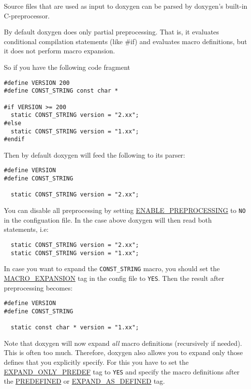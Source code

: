 Source files that are used as input to doxygen can be parsed by doxygen's built-in C-preprocessor.

By default doxygen does only partial preprocessing. That is, it evaluates conditional compilation statements (like \#if) and evaluates macro definitions, but it does not perform macro expansion.

So if you have the following code fragment 

\footnotesize\begin{verbatim}
#define VERSION 200
#define CONST_STRING const char *

#if VERSION >= 200
  static CONST_STRING version = "2.xx";
#else
  static CONST_STRING version = "1.xx";
#endif
\end{verbatim}
\normalsize


Then by default doxygen will feed the following to its parser:



\footnotesize\begin{verbatim}
#define VERSION
#define CONST_STRING

  static CONST_STRING version = "2.xx";
\end{verbatim}
\normalsize


You can disable all preprocessing by setting \hyperlink{config_cfg_enable_preprocessing}{ENABLE\_\-PREPROCESSING} to {\tt NO} in the configuation file. In the case above doxygen will then read both statements, i.e:



\footnotesize\begin{verbatim}
  static CONST_STRING version = "2.xx";
  static CONST_STRING version = "1.xx";
\end{verbatim}
\normalsize


In case you want to expand the {\tt CONST\_\-STRING} macro, you should set the \hyperlink{config_cfg_macro_expansion}{MACRO\_\-EXPANSION} tag in the config file to {\tt YES}. Then the result after preprocessing becomes:



\footnotesize\begin{verbatim}
#define VERSION
#define CONST_STRING

  static const char * version = "1.xx";
\end{verbatim}
\normalsize


Note that doxygen will now expand {\em all\/} macro definitions (recursively if needed). This is often too much. Therefore, doxygen also allows you to expand only those defines that you explicitly specify. For this you have to set the \hyperlink{config_cfg_expand_only_predef}{EXPAND\_\-ONLY\_\-PREDEF} tag to {\tt YES} and specify the macro definitions after the \hyperlink{config_cfg_predefined}{PREDEFINED} or \hyperlink{config_cfg_expand_as_defined}{EXPAND\_\-AS\_\-DEFINED} tag.

